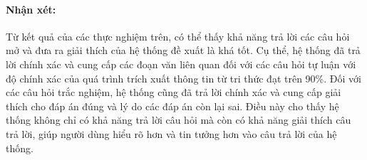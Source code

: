 \paragraph{Nhận xét:} Từ kết quả của các thực nghiệm trên, có thể thấy khả năng trả lời các câu hỏi mở và đưa ra giải thích của hệ thống đề xuất là khá tốt. Cụ thể, hệ thống đã trả lời chính xác và cung cấp các đoạn văn liên quan đối với các câu hỏi tự luận với độ chính xác của quá trình trích xuất thông tin từ tri thức đạt trên 90\%. Đối với các câu hỏi trắc nghiệm, hệ thống cũng đã trả lời chính xác và cung cấp giải thích cho đáp án đúng và lý do các đáp án còn lại sai. Điều này cho thấy hệ thống không chỉ có khả năng trả lời câu hỏi mà còn có khả năng giải thích câu trả lời, giúp người dùng hiểu rõ hơn và tin tưởng hơn vào câu trả lời của hệ thống.